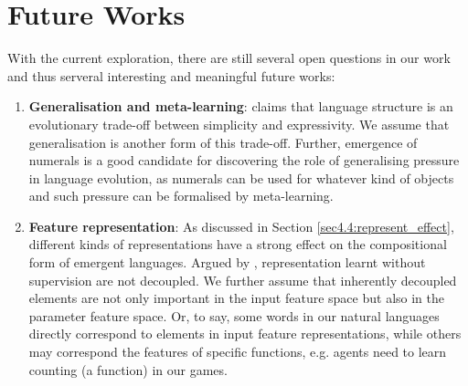 \section{Future Works}
\label{sec5.2:future_work}

With the current exploration, there are still several open questions in our work and thus serveral interesting and meaningful future works:

\begin{enumerate}
    \item \textbf{Generalisation and meta-learning}: \cite{smith2013linguistic} claims that language structure is an evolutionary trade-off between simplicity and expressivity. We assume that generalisation is another form of this trade-off. Further, emergence of numerals is a good candidate for discovering the role of generalising pressure in language evolution, as numerals can be used for whatever kind of objects and such pressure can be formalised by meta-learning.
    \item \textbf{Feature representation}: As discussed in Section \ref{sec4.4:represent_effect}, different kinds of representations have a strong effect on the compositional form of emergent languages. Argued by \cite{locatello2018challenging}, representation learnt without supervision are not decoupled. We further assume that inherently decoupled elements are not only important in the input feature space but also in the parameter feature space. Or, to say, some words in our natural languages directly correspond to elements in input feature representations, while others may correspond the features of specific functions, e.g. agents need to learn counting (a function) in our games.
\end{enumerate}